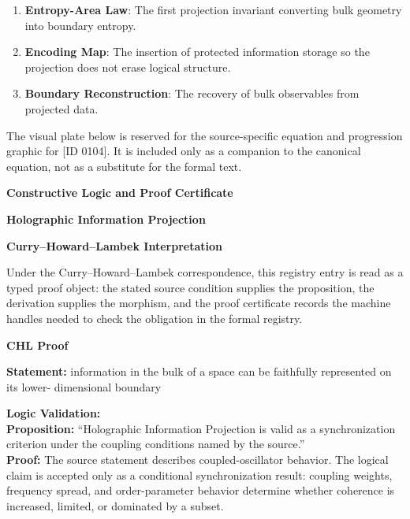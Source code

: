 \begin{enumerate}[leftmargin=1.6em,itemsep=6pt,topsep=4pt]
\item \textbf{Entropy-Area Law}: The first projection invariant converting bulk geometry into boundary entropy.
\item \textbf{Encoding Map}: The insertion of protected information storage so the projection does not erase logical structure.
\item \textbf{Boundary Reconstruction}: The recovery of bulk observables from projected data.
\end{enumerate}

\begingroup\footnotesize\sloppy
The visual plate below is reserved for the source-specific equation and progression graphic for [ID 0104]. It is included only as a companion to the canonical equation, not as a substitute for the formal text.
\par\endgroup
\ifTZPDarkEdition
{}
\fi

\clearpage
\begingroup\tzpsupportsetup
\noindent\textbf{\fontsize{10.8pt}{12.8pt}\selectfont [ID 0104] Constructive Logic and Proof Certificate}\par
\noindent\textbf{\fontsize{10pt}{12pt}\selectfont Holographic Information Projection}\par
\vspace{0.45em}
\begingroup
\footnotesize
\setlength{\parskip}{0.22em}
\setlength{\parindent}{0pt}
\noindent\textbf{Curry--Howard--Lambek Interpretation}\par
Under the Curry--Howard--Lambek correspondence, this registry entry is read as a typed proof
object: the stated source condition supplies the proposition, the derivation supplies the
morphism, and the proof certificate records the machine handles needed to check the obligation
in the formal registry.

\vspace{0.45em}
\noindent\textbf{CHL Proof}\par
\textbf{Statement:} information in the bulk of a space can be faithfully represented on its lower-
dimensional boundary

\textbf{Logic Validation:}\\
\textbf{Proposition:} ``Holographic Information Projection is valid as a synchronization criterion under the
coupling conditions named by the source.''\\
\textbf{Proof:} The source statement describes coupled-oscillator behavior. The logical claim is
accepted only as a conditional synchronization result: coupling weights, frequency
spread, and order-parameter behavior determine whether coherence is increased, limited,
or dominated by a subset.

